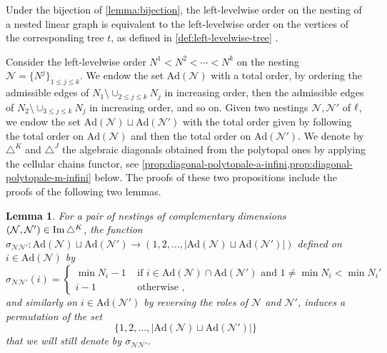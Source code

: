 \documentclass[10pt]{amsart}
\newtheorem{lemma}[definition]{Lemma}
\theoremstyle{remark}
\begin{document}
\noindent  Under the bijection of \cref{lemma:bijection}, the left-levelwise order on the nesting of a nested linear graph is equivalent to the left-levelwise order on the vertices of the corresponding tree $t$, as defined in \cref{def:left-levelwise-tree} .


Consider the left-levelwise order $N^1<N^2<\cdots < N^k$ on the nesting $\mathcal{N}=\{N^j\}_{1\leq j \leq k}$.
We endow the set $\mathrm{Ad}(\mathcal{N})$ with a total order, by ordering the admissible edges of $N_1 \setminus \cup_{2\leq j \leq k} N_j$ in increasing order, then the admissible edges of $N_2 \setminus \cup_{3\leq j \leq k} N_j$ in increasing order, and so on. 
Given two nestings $\mathcal{N}, \mathcal{N}'$ of $\ell$, we endow the set $\mathrm{Ad}(\mathcal{N})\sqcup \mathrm{Ad}(\mathcal{N}')$ with the total order given by following the total order on $\mathrm{Ad}(\mathcal{N})$ and then the total order on $\mathrm{Ad}(\mathcal{N}')$. 
We denote by $\triangle^K$ and $\triangle^J$ the algebraic diagonals obtained from the polytopal ones by applying the cellular chains functor, see \cref{prop:diagonal-polytopale-a-infini,prop:diagonal-polytopale-m-infini} below. 
The proofs of these two propositions include the proofs of the following two lemmas. 

\begin{lemma} 
\label{prop:signs-ass}
For a pair of nestings of complementary dimensions $(\mathcal{N}, \mathcal{N}')\in \operatorname{Im}\triangle^K$, the function $\sigma_{\mathcal{N}\mathcal{N}'}: \mathrm{Ad}(\mathcal{N})\sqcup \mathrm{Ad}(\mathcal{N}') \to (1,2,\ldots,|\mathrm{Ad}(\mathcal{N})\sqcup \mathrm{Ad}(\mathcal{N}')|)$ defined on $i \in \mathrm{Ad}(\mathcal{N})$ by 
\begin{equation*}
  \sigma_{\mathcal{N}\mathcal{N}'}(i)= 
  \begin{cases}
    \min N_i -1 & \text{ if } i \in \mathrm{Ad}(\mathcal{N})\cap \mathrm{Ad}(\mathcal{N}') \text{ and } 1 \neq \min N_i < \min N_i' \\ 
    i-1 & \text{ otherwise ,} 
  \end{cases}
\end{equation*}
and similarly on $i \in \mathrm{Ad}(\mathcal{N}')$ by reversing the roles of $\mathcal{N}$ and $\mathcal{N}'$, induces a permutation of the set $$\{1,2,\ldots,|\mathrm{Ad}(\mathcal{N})\sqcup \mathrm{Ad}(\mathcal{N}')|\}$$ that we will still denote by $\sigma_{\mathcal{N}\mathcal{N}'}$.
\end{lemma}
\end{document}
